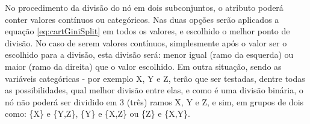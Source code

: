 
No procedimento da divisão do nó em dois subconjuntos, o atributo poderá conter valores contínuos ou categóricos. Nas duas opções serão aplicados a equação \ref{eq:cartGiniSplit} em todos os valores, e escolhido o melhor ponto de divisão. No caso de serem valores contínuos, simplesmente após o valor ser o escolhido para a divisão, esta divisão será: menor igual (ramo da esquerda) ou maior (ramo da direita) que o valor escolhido. Em outra situação, sendo as variáveis  categóricas - por exemplo X, Y e Z, terão que ser testadas, dentre todas as possibilidades, qual melhor divisão entre elas, e como é uma divisão binária, o nó não poderá ser dividido em 3 (três) ramos X, Y e Z, e sim, em grupos de dois como: \{X\} e \{Y,Z\}, \{Y\} e \{X,Z\} ou \{Z\} e \{X,Y\}.

% 
% 






